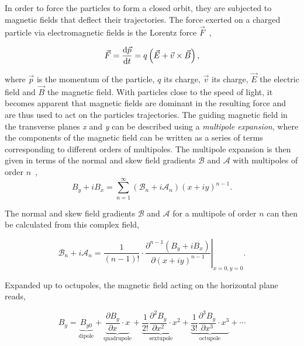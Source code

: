 \subsection{}

In order to force the particles to form a closed orbit, they are subjected to magnetic fields that
deflect their trajectories. The force exerted on a charged particle via electromagnetic fields is
the Lorentz force $\vec{F}$~\cite{wiedemann_particle_2015},

\begin{equation}
    \vec{F} = \frac{\mathop{}\!\mathrm{d} \vec{p}}{\mathop{}\!\mathrm{d} t} = q \left( \vec{E} + \vec{v} \times \vec{B} \right),
\end{equation}

where $\vec{p}$ is the momentum of the particle, $q$ its charge, $\vec{v}$ its charge, $\vec{E}$ the
electric field and $\vec{B}$ the magnetic field. With particles close to the speed of light, it
becomes apparent that magnetic fields are dominant in the resulting force and are thus used to act
on the particles trajectories.
The guiding magnetic field in the transverse planes \textit{x} and \textit{y} can be described using
a \textit{multipole expansion}, where the components of the magnetic field can be written as a
series of terms corresponding to different orders of multipoles. The multipole expansion is then
given in terms of the normal and skew field gradients $\mathcal{B}$ and $\mathcal{A}$ with
multipoles of order $n$~\cite{wolf_engineering_2001},
\begin{equation}
    B_y + iB_x = \sum_{n=1}^\infty \left(\mathcal{B}_n + i\mathcal{A}_n \right)  (x+iy)^{n-1}.
\end{equation}

The normal and skew field gradients $\mathcal{B}$ and $\mathcal{A}$ for a multipole of order $n$ can
then be calculated from this complex field,

\begin{equation}
    \mathcal{B}_n + i\mathcal{A}_n = \left.\frac{1}{(n-1)!} \cdot \frac{\partial^{n-1}\left(B_y + iB_x\right)}{\partial(x+iy)^{n-1}}\right|_{x=0,y=0}.
\end{equation}

Expanded up to octupoles, the magnetic field acting on the horizontal plane reads,

\begin{equation}
    B_y = \underbrace{B_{y0}}_{\textrm{dipole}}
        + \underbrace{\frac{\partial B_y}{\partial x} \cdot x}_{\textrm{quadrupole}}
        + \underbrace{\frac{1}{2!} \frac{\partial^2 B_y}{\partial x^2} \cdot x^2}_{\textrm{sextupole}}
        + \underbrace{\frac{1}{3!} \frac{\partial^3 B_y}{\partial x^3} \cdot x^3}_{\textrm{octupole}}
        + \cdots
\end{equation}

